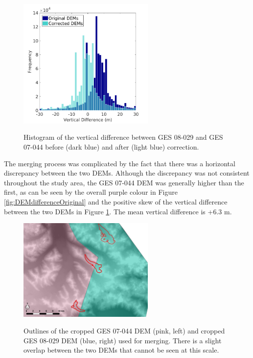 \documentclass{sfuthesis}
\begin{document}
\begin{figure}
	\centering
	\includegraphics[width = 0.6\textwidth]{DEMcorrection_hist.png}\\
	\caption[Histogram of the vertical difference between GES 08-029 and GES 07-044 before and after correction.]{Histogram of the vertical difference between GES 08-029 and GES 07-044 before (dark blue) and after (light blue) correction. }
	\label{fig:DEMcorrection_hist}
\end{figure}    
    

The merging process was complicated by the fact that there was a horizontal discrepancy between the two DEMs. Although the discrepancy was not consistent throughout the study area, the GES 07-044 DEM was generally higher than the first, as can be seen by the overall purple colour in Figure \ref{fig:DEMdifferenceOriginal} and the positive skew of the vertical difference between the two DEMs in Figure \ref{fig:DEMcorrection_hist}. The mean vertical difference is +6.3 m.


\begin{figure}
	\centering
	\includegraphics[width = 0.6\textwidth]{mergeLine.jpeg}\\
	\caption[Outlines of the cropped GES 07-044 DEM and cropped GES 08-029 DEM used for merging]{Outlines of the cropped GES 07-044 DEM (pink, left) and cropped GES 08-029 DEM (blue, right) used for merging. There is a slight overlap between the two DEMs that cannot be seen at this scale.}
	\label{fig:mergeLine}
\end{figure}
\end{document}
